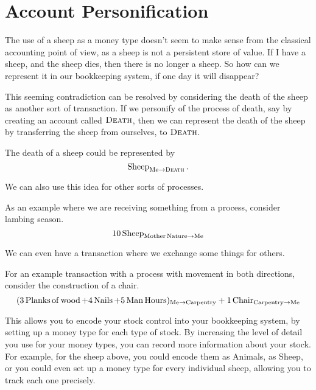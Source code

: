 \section{Account Personification}

The use of a sheep as a money type doesn't seem to make sense from the classical accounting point of view,
as a sheep is not a persistent store of value.
If I have a sheep, and the sheep dies, then there is no longer a sheep.
So how can we represent it in our bookkeeping system, if one day it will disappear?

This seeming contradiction can be resolved by considering the death of the sheep as another sort of transaction.
If we personify of the process of death, say by creating an account called $\operatorname{\textsc{Death}}$,
then we can represent the death of the sheep by transferring the sheep from ourselves, to $\operatorname{\textsc{Death}}$.

\begin{example}
    The death of a sheep could be represented by
    \begin{equation*}
        \operatorname{Sheep}_{\operatorname{Me} \to \operatorname{\textsc{Death}}}.
    \end{equation*}
\end{example}

We can also use this idea for other sorts of processes.

\begin{example}
    As an example where we are receiving something from a process, consider lambing season.
    \begin{equation*}
        10 \operatorname{Sheep}_{\operatorname{Mother\,Nature} \to \operatorname{Me}}
    \end{equation*}
\end{example}

We can even have a transaction where we exchange some things for others.

\begin{example}
    For an example transaction with a process with movement in both directions,
    consider the construction of a chair.
    \begin{equation*}
        (
        3 \operatorname{Planks\,of\,wood} +
        4 \operatorname{Nails} +
        5 \operatorname{Man\,Hours}
        )_{\operatorname{Me} \to \operatorname{Carpentry}} +
        1 \operatorname{Chair}_{\operatorname{Carpentry} \to \operatorname{Me}}
    \end{equation*}
\end{example}

This allows you to encode your stock control into your bookkeeping system, by setting up a money type for each type of stock.
By increasing the level of detail you use for your money types, you can record more information about your stock.
For example, for the sheep above, you could encode them as Animals, as Sheep,
or you could even set up a money type for every individual sheep, allowing you to track each one precisely.
